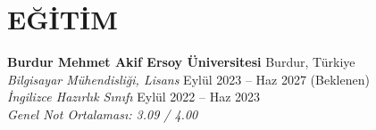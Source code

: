 \section{EĞİTİM}

\textbf{Burdur Mehmet Akif Ersoy Üniversitesi} \hfill Burdur, Türkiye \\
\textit{Bilgisayar Mühendisliği, Lisans} \hfill Eylül 2023 -- Haz 2027 (Beklenen) \\
\textit{İngilizce Hazırlık Sınıfı} \hfill Eylül 2022 -- Haz 2023 \\
\textit{Genel Not Ortalaması: 3.09 / 4.00}



